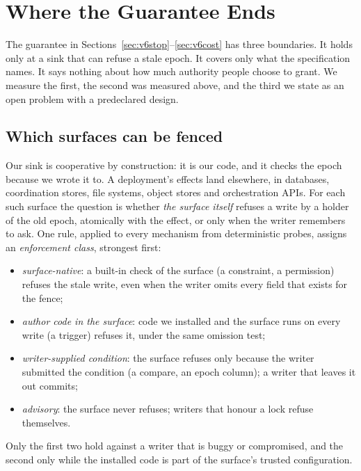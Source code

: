 \section{Where the Guarantee Ends}\label{sec:v6boundary}

The guarantee in Sections~\ref{sec:v6stop}--\ref{sec:v6cost} has three boundaries. It holds only at a sink that can
refuse a stale epoch. It covers only what the specification names. It says nothing about how much authority people
choose to grant. We measure the first, the second was measured above, and the third we state as an open problem with a
predeclared design.

\subsection{Which surfaces can be fenced}

Our sink is cooperative by construction: it is our code, and it checks the epoch because we wrote it to. A deployment's
effects land elsewhere, in databases, coordination stores, file systems, object stores and orchestration APIs. For each
such surface the question is whether \emph{the surface itself} refuses a write by a holder of the old epoch, atomically
with the effect, or only when the writer remembers to ask. One rule, applied to every mechanism from deterministic
probes, assigns an \emph{enforcement class}, strongest first:
\begin{itemize}
  \item \emph{surface-native}: a built-in check of the surface (a constraint, a permission) refuses the stale write, even
        when the writer omits every field that exists for the fence;
  \item \emph{author code in the surface}: code we installed and the surface runs on every write (a trigger) refuses it,
        under the same omission test;
  \item \emph{writer-supplied condition}: the surface refuses only because the writer submitted the condition (a compare,
        an epoch column); a writer that leaves it out commits;
  \item \emph{advisory}: the surface never refuses; writers that honour a lock refuse themselves.
\end{itemize}
Only the first two hold against a writer that is buggy or compromised, and the second only while the installed code is
part of the surface's trusted configuration.

